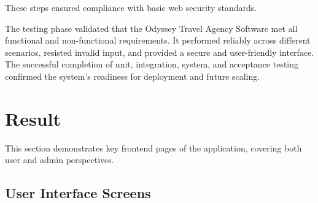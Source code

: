These steps ensured compliance with basic web security standards.

The testing phase validated that the Odyssey Travel Agency Software met all functional and non-functional requirements. It performed reliably across different scenarios, resisted invalid input, and provided a secure and user-friendly interface. The successful completion of unit, integration, system, and acceptance testing confirmed the system's readiness for deployment and future scaling.

\section{Result}

This section demonstrates key frontend pages of the application, covering both user and admin perspectives.

\subsection*{User Interface Screens}

